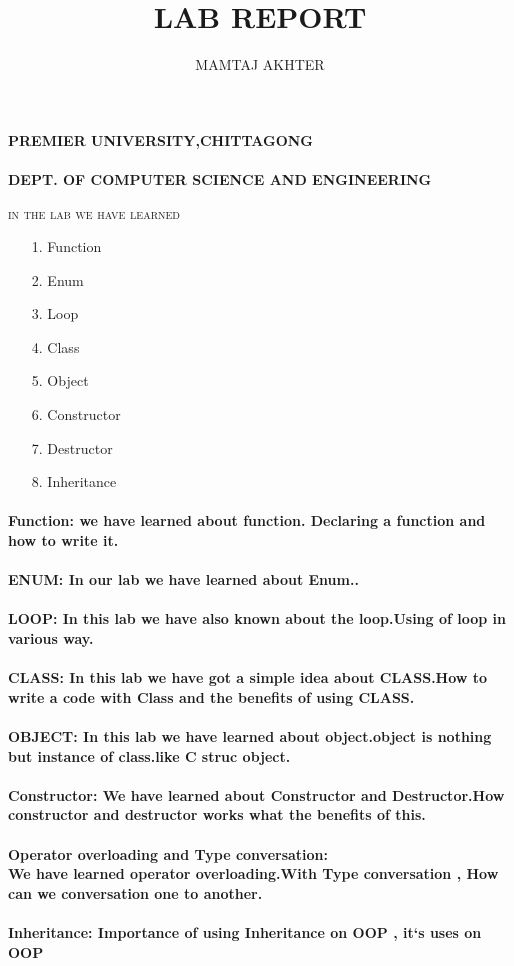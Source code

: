 \documentclass[12pt]{article}
\title{LAB REPORT}
\author{MAMTAJ AKHTER}
\begin{document}
\textbf{\bigskip \bigskip \bigskip \bigskip \bigskip \bigskip \bigskip \bigskip  \center PREMIER UNIVERSITY,CHITTAGONG \\}
 \textbf{\\DEPT. OF COMPUTER SCIENCE AND ENGINEERING}
\maketitle
\newpage
\textsc{\center in the  lab we have learned \\}
 \begin{itemize}
   \item[1.] Function \item[2.] Enum \item[3.] Loop  \item[4.] Class  \item[5.]  Object    \item[6.] Constructor  \item[7.]  Destructor  \item[8.] Inheritance
  \end{itemize}
  \bigskip \bigskip \bigskip \bigskip
  \paragraph{Function: 
  we have  learned about function. Declaring  a function and how to write it.
  } 
  \paragraph{ENUM: 
   In our  lab we have learned about Enum..}
  \paragraph{LOOP: 
   In this lab we have  also known about the loop.Using of  loop in various way.
  } 
   \paragraph{CLASS: 
   In this  lab we have got a simple idea about CLASS.How to write a code with Class and the benefits of using  CLASS.}
  \paragraph{OBJECT: 
  In this lab we have  learned  about object.object is nothing but instance of class.like C struc object. 
  }
  \paragraph{Constructor: 
  We have learned about Constructor and Destructor.How constructor and destructor works what the benefits of this. \\}
    \paragraph{Operator overloading and Type conversation:\\
   We have learned operator overloading.With Type conversation , How can we conversation one to another. \\}
    \paragraph{Inheritance: 
    Importance of using Inheritance on OOP , it`s uses on OOP }
\end{document}

